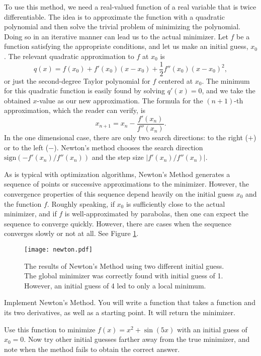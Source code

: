 To use this method, we need a real-valued function of a real variable that is twice
differentiable. The idea is to approximate the function with a quadratic polynomial and
then solve the trivial problem of minimizing the polynomial. Doing so in an iterative
manner can lead us to the actual minimizer. Let $f$ be a function satisfying the
appropriate conditions, and let us make an initial guess, $x_0$. The relevant quadratic
approximation to $f$ at $x_0$ is
\begin{equation*}
q(x) = f(x_0) + f'(x_0)(x-x_0) + \frac{1}{2}f''(x_0)(x-x_0)^2,
\end{equation*}
or just the second-degree Taylor polynomial for $f$ centered at $x_0$. The minimum
for this quadratic function is easily found by solving $q'(x) = 0$, and we take the
obtained $x$-value as our new approximation. The formula for the $(n+1)$-th
approximation, which the reader can verify, is
\begin{equation*}
x_{n+1} = x_n - \frac{f'(x_n)}{f''(x_n)}.
\end{equation*}
In the one dimensional case, there are only two search directions: to the right ($+$)
or to the left ($-$). Newton's method chooses the search direction 
$\text{sign}(-f'(x_n)/f''(x_n))$ and the step size $|f'(x_n)/f''(x_n)|$.

As is typical with optimization algorithms, Newton's Method generates a sequence of
points or successive approximations to the minimizer. However, the convergence
properties of this sequence depend heavily on the initial guess $x_0$ and the function
$f$. Roughly speaking, if $x_0$ is sufficiently close to the actual minimizer, and if
$f$ is well-approximated by parabolas, then one can expect the sequence to converge
quickly. However, there are cases when the sequence converges slowly or not at all.
See Figure \ref{linesearch:newton}.

\begin{figure}
\centering
\texttt{[image: newton.pdf]}
\caption{The results of Newton's Method using two
different initial guess. The global minimizer was
correctly found with initial guess of 1. However,
an initial guess of 4 led to only a local minimum.}
\label{linesearch:newton}
\end{figure}

\begin{problem}
Implement Newton's Method. You will write a function that takes a function and its two derivatives, as well as 
a starting point. It will return the minimizer. 

Use this function to minimize $f(x) = x^2 + \sin(5x)$ with an initial guess of $x_0 = 0$.
Now try other initial guesses farther away from the true minimizer, and note when the
method fails to obtain the correct answer.
\end{problem}

